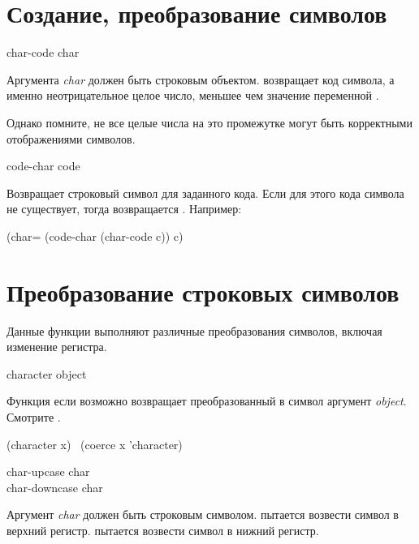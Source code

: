 \section{Создание, преобразование символов}

\begin{defun}[Функция]
char-code char

Аргумента \emph{char} должен быть строковым объектом.
 возвращает код символа, а именно неотрицательное целое число,
меньшее чем значение переменной .

Однако помните, не все целые числа на это промежутке могут быть корректными
отображениями символов.
\end{defun}

\begin{defun}[Функция]
code-char code

Возвращает строковый символ для заданного кода. Если для этого кода символа не
существует, тогда возвращается {\nil}.
Например:
\begin{lisp}
(char= (code-char (char-code c)) c)
\end{lisp}
\end{defun}

\section{Преобразование строковых символов}

Данные функции выполняют различные преобразования символов, включая изменение
регистра.

\begin{defun}[Функция]
character object

Функция  если возможно возвращает преобразованный в символ
аргумент \emph{object}. Смотрите .
\begin{lisp}
(character x) \EQ\ (coerce x 'character)
\end{lisp}
\end{defun}

\begin{defun}[Функция]
char-upcase char \\
char-downcase char

Аргумент \emph{char} должен быть строковым символом.
 пытается возвести символ в верхний
регистр.  пытается возвести символ в нижний регистр.
\end{defun}

